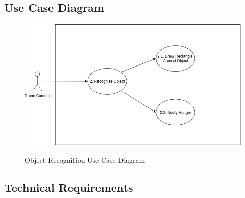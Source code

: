 \subsection{Use Case Diagram}
\begin{flushleft}
	\begin{figure}[h!]
		\centering
		\includegraphics[scale=0.5]{./assets/images/object-recognition-ucd.jpg}
		\label{fig: object-recognition-ucd }
		\caption{Object Recognition Use Case Diagram}
	\end{figure}

\end{flushleft}

\subsection{Technical Requirements}
	\begin{flushleft}
	\end{flushleft}
